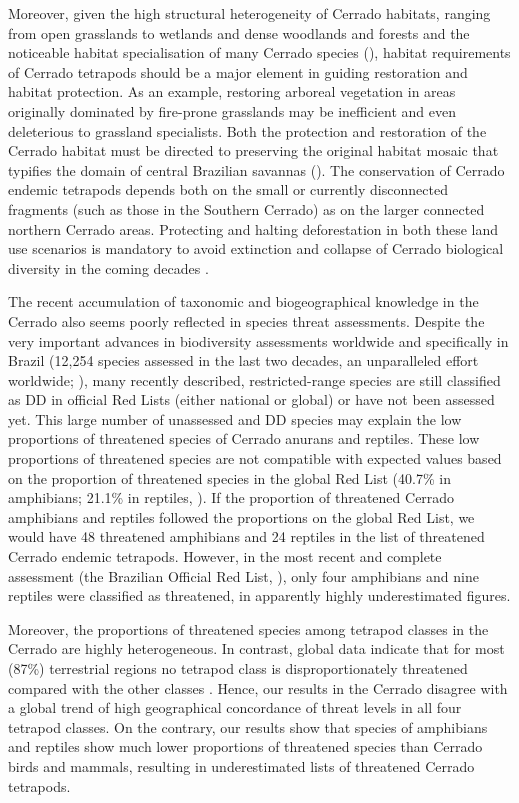 \documentclass[12pt,openright,oneside,a4paper,english]{abntex2}
\begin{document}
Moreover, given the high structural heterogeneity of Cerrado habitats, ranging from open grasslands to wetlands and dense woodlands and forests and the noticeable habitat specialisation of many Cerrado species (\citealp[see][]{Silva2002, Nogueira2009, Nogueira2011}), habitat requirements of Cerrado tetrapods should be a major element in guiding restoration and habitat protection. As an example, restoring arboreal vegetation in areas originally dominated by fire-prone grasslands may be inefficient and even deleterious to grassland specialists. Both the protection and restoration of the Cerrado habitat must be directed to preserving the original habitat mosaic that typifies the domain of central Brazilian savannas (\citealp[see][]{Silva2002}). The conservation of Cerrado endemic tetrapods depends both on the small or currently disconnected fragments (such as those in the Southern Cerrado) as on the larger connected northern Cerrado areas. Protecting and halting deforestation in both these land use scenarios is mandatory to avoid extinction and collapse of Cerrado biological diversity in the coming decades \citep{VieiraAlencar2023}.

The recent accumulation of taxonomic and biogeographical knowledge in the Cerrado also seems poorly reflected in species threat assessments. Despite the very important advances in biodiversity assessments worldwide and specifically in Brazil (12,254 species assessed in the last two decades, an unparalleled effort worldwide; \citealp{ICMBio2018}), many recently described, restricted-range species are still classified as DD in official Red Lists (either national or global) or have not been assessed yet. This large number of unassessed and DD species may explain the low proportions of threatened species of Cerrado anurans and reptiles. These low proportions of threatened species are not compatible with expected values based on the proportion of threatened species in the global Red List (40.7\% in amphibians; 21.1\% in reptiles, \citealp[see][]{Cox2022, Borgelt2022}). If the proportion of threatened Cerrado amphibians and reptiles followed the proportions on the global Red List, we would have 48 threatened amphibians and 24 reptiles in the list of threatened Cerrado endemic tetrapods. However, in the most recent and complete assessment (the Brazilian Official Red List, \citealp{ICMBio2023}), only four amphibians and nine reptiles were classified as threatened, in apparently highly underestimated figures.

Moreover, the proportions of threatened species among tetrapod classes in the Cerrado are highly heterogeneous. In contrast, global data indicate that for most (87\%) terrestrial regions no tetrapod class is disproportionately threatened compared with the other classes \citep{Cox2022}. Hence, our results in the Cerrado disagree with a global trend of high geographical concordance of threat levels in all four tetrapod classes. On the contrary, our results show that species of amphibians and reptiles show much lower proportions of threatened species than Cerrado birds and mammals, resulting in underestimated lists of threatened Cerrado tetrapods.
\end{document}
